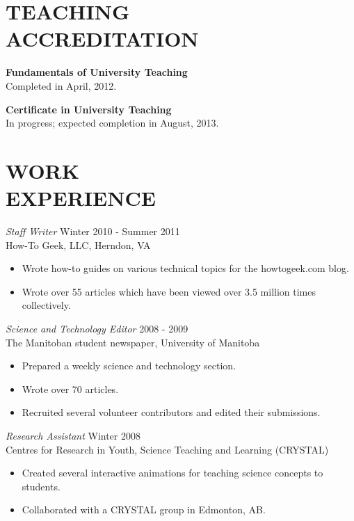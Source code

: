 \documentclass[line,margin]{res}
\begin{document}
\begin{resume}
\section{TEACHING \\ACCREDITATION}
  {\bf Fundamentals of University Teaching} \\
  Completed in April, 2012.

  {\bf Certificate in University Teaching} \\
  In progress; expected completion in August, 2013.

\section{WORK \\EXPERIENCE}
  {\sl Staff Writer} \hfill Winter 2010 - Summer 2011 \\
  How-To Geek, LLC, Herndon, VA
  \begin{itemize}  \itemsep -2pt %
    \item Wrote how-to guides on various technical topics for the howtogeek.com blog.
    \item Wrote over 55 articles which have been viewed over 3.5 million times collectively.
  \end{itemize}
  
  {\sl Science and Technology Editor} \hfill 2008 - 2009 \\
  The Manitoban student newspaper, University of Manitoba
  \begin{itemize}  \itemsep -2pt %
    \item Prepared a weekly science and technology section.
    \item Wrote over 70 articles.
    \item Recruited several volunteer contributors and edited their submissions.
  \end{itemize}
  
  {\sl Research Assistant} \hfill Winter 2008 \\
  Centres for Research in Youth, Science Teaching and Learning (CRYSTAL)
  \begin{itemize}  \itemsep -2pt %
    \item Created several interactive animations for teaching science concepts to students.
    \item Collaborated with a CRYSTAL group in Edmonton, AB.
  \end{itemize}
  

\end{resume}
\end{document}
